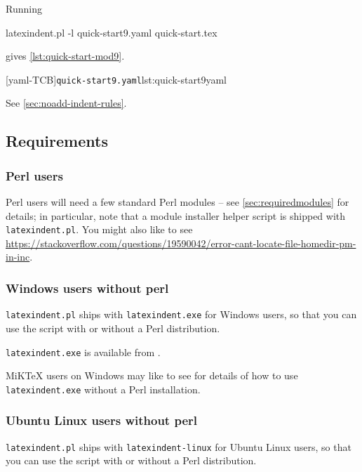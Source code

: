  \begin{example}
 Running

 \begin{commandshell}
latexindent.pl -l quick-start9.yaml quick-start.tex
\end{commandshell}

 gives \cref{lst:quick-start-mod9}.

 \begin{cmhtcbraster}
  [yaml-TCB]{\texttt{quick-start9.yaml}}{lst:quick-start9yaml}
 \end{cmhtcbraster}

 See \cref{sec:noadd-indent-rules}.
 \end{example}

\subsection{Requirements}
\subsubsection{Perl users}
 Perl users will need a few standard Perl modules -- see \vref{sec:requiredmodules} for
 details;  in particular, note
 that a module installer helper script is shipped with \texttt{latexindent.pl}. You might
 also like to see
 \href{https://stackoverflow.com/questions/19590042/error-cant-locate-file-homedir-pm-in-inc}{https://stackoverflow.com/questions/19590042/error-cant-locate-file-homedir-pm-in-inc}.%

\subsubsection{Windows users without perl}\label{subsubsec:latexindent:exe}
 \texttt{latexindent.pl} ships with \texttt{latexindent.exe} for Windows
 users, so that you can use the script with or without a Perl distribution.

 \texttt{latexindent.exe} is available from \cite{latexindent-home}.

 MiKTeX users on Windows may like to see \cite{miktex-guide} for details of how to use
 \texttt{latexindent.exe} without a Perl installation. 
  

\subsubsection{Ubuntu Linux users without perl}
 \texttt{latexindent.pl} ships with \texttt{latexindent-linux} for Ubuntu
 Linux users, so that you can use the script with or without a Perl distribution.
   

